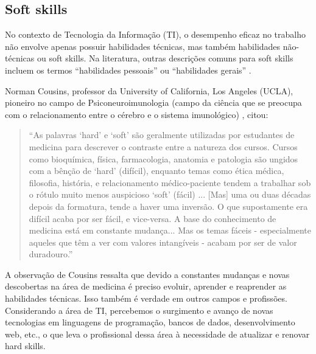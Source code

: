 \subsection{Soft skills}
\label{subsec:ss}

No contexto de Tecnologia da Informação (TI), o desempenho eficaz no trabalho não envolve apenas possuir habilidades técnicas, mas também habilidades não-técnicas ou soft skills. Na literatura, outras descrições comuns para soft skills incluem os termos ``habilidades pessoais'' ou ``habilidades gerais'' \cite{joseph:99}.

Norman Cousins, professor da University of California, Los Angeles (UCLA), pioneiro no campo de Psiconeuroimunologia (campo da ciência que se preocupa com o relacionamento entre o cérebro e o sistema imunológico) \cite{crosbie:05}, citou:

\begin{quote}
``As palavras `hard' e `soft' são geralmente utilizadas por estudantes de medicina para descrever o contraste entre a natureza dos cursos. Cursos como bioquímica, física, farmacologia, anatomia e patologia são ungidos com a bênção de `hard' (difícil), enquanto temas como ética médica, filosofia, história, e relacionamento médico-paciente tendem a trabalhar sob o rótulo muito menos auspicioso `soft' (fácil) 
... [Mas] uma ou duas décadas depois da formatura, tende a haver uma inversão. O que supostamente era difícil acaba por ser fácil, e vice-versa.
A base do conhecimento de medicina está em constante mudança... Mas os temas fáceis - especialmente aqueles que têm a ver com valores intangíveis - acabam por ser de valor duradouro.''
\end{quote}

A observação de Cousins ressalta que devido a constantes mudanças e novas descobertas na área de medicina é preciso evoluir, aprender e reaprender as habilidades técnicas. Isso também é verdade em outros campos e profissões. Considerando a área de TI, percebemos o surgimento e avanço de novas tecnologias em linguagens de programação, bancos de dados, desenvolvimento web, etc., o que leva o profissional dessa área à necessidade de atualizar e renovar hard skills.

